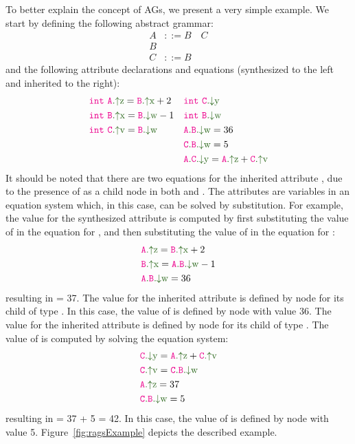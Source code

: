 To better explain the concept of AGs, we present a very simple example. 
We start by defining the following abstract grammar:
    \begin{align*}
        A& ::= B \quad C \\
        B& \\
        C& ::= B
    \end{align*}
and the following attribute declarations and equations (synthesized to the left and inherited to the right):
    \begin{align*}
        \astnode{int} \ &\Asyn{A}{z} = \Asyn{B}{x} + 2  &&\astnode{int} \ \Ainh{C}{y} \\
        \astnode{int} \ &\Asyn{B}{x} = \Ainh{B}{w} -1   &&\astnode{int} \ \Ainh{B}{w}  \\
        \astnode{int} \ &\Asyn{C}{v} = \Ainh{B}{w}   & &\Ainhdef{A}{B}{w} = 36\\
        & && \Ainhdef{C}{B}{w} = 5\\
        &&& \Ainhdef{A}{C}{y} = \Asyn{A}{z} + \Asyn{C}{v} \\
    \end{align*}
It should be noted that there are two equations for the inherited attribute ,
due to the presence of  as a child node in both  and .
The attributes are variables in an equation system which, in this case, can be solved by substitution.
For example, the value for the synthesized attribute  is computed by first 
substituting the value of  in the equation for , and then
substituting the value of  in the equation for :
\begin{align*}
    &\Asyn{A}{z} = \Asyn{B}{x} + 2 \\
    &\Asyn{B}{x} = \Ainhdef{A}{B}{w} - 1 \\
    &\Ainhdef{A}{B}{w} = 36
\end{align*}
resulting in  = 37. The value for the inherited attribute  is defined by node  for
its child of type . In this case, the value of  is defined by node  
with value 36.
The value for the inherited attribute  is defined by node  for
its child of type . The value of  is computed by solving the equation system:
\begin{align*}
    &\Ainh{C}{y} = \Asyn{A}{z} + \Asyn{C}{v} \\
    &\Asyn{C}{v} = \Ainhdef{C}{B}{w}\\
    &\Asyn{A}{z} = 37 \\
    &\Ainhdef{C}{B}{w}  = 5
\end{align*}
resulting in  = 37 + 5 = 42. In this case, the value of  
is defined by node  with value 5. 
Figure~\ref{fig:ragsExample} depicts the described example.


